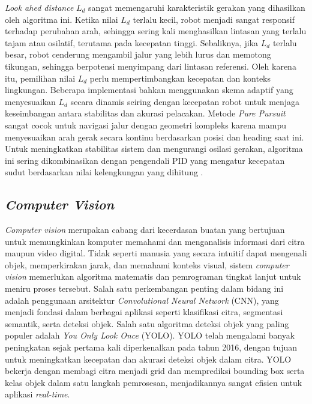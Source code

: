 \emph{Look ahed distance} \(L_d\) sangat memengaruhi karakteristik gerakan yang dihasilkan oleh algoritma ini. Ketika nilai \(L_d\) terlalu kecil, robot menjadi sangat responsif terhadap perubahan arah, sehingga sering kali menghasilkan lintasan yang terlalu tajam atau osilatif, terutama pada kecepatan tinggi. Sebaliknya, jika \(L_d\) terlalu besar, robot cenderung mengambil jalur yang lebih lurus dan memotong tikungan, sehingga berpotensi menyimpang dari lintasan referensi. Oleh karena itu, pemilihan nilai \(L_d\) perlu mempertimbangkan kecepatan dan konteks lingkungan. Beberapa implementasi bahkan menggunakan skema adaptif yang menyesuaikan \(L_d\) secara dinamis seiring dengan kecepatan robot untuk menjaga keseimbangan antara stabilitas dan akurasi pelacakan. Metode \emph{Pure Pursuit} sangat cocok untuk navigasi jalur dengan geometri kompleks karena mampu menyesuaikan arah gerak secara kontinu berdasarkan posisi dan heading saat ini. Untuk meningkatkan stabilitas sistem dan mengurangi osilasi gerakan, algoritma ini sering dikombinasikan dengan pengendali PID yang mengatur kecepatan sudut berdasarkan nilai kelengkungan yang dihitung \cite{coulter1992implementation}.


\subsection{\emph{Computer Vision}}

\emph{Computer vision} merupakan cabang dari kecerdasan buatan yang bertujuan untuk memungkinkan komputer memahami dan menganalisis informasi dari citra maupun video digital. Tidak seperti manusia yang secara intuitif dapat mengenali objek, memperkirakan jarak, dan memahami konteks visual, sistem \emph{computer vision} memerlukan algoritma matematis dan pemrograman tingkat lanjut untuk meniru proses tersebut. Salah satu perkembangan penting dalam bidang ini adalah penggunaan arsitektur \emph{Convolutional Neural Network} (CNN), yang menjadi fondasi dalam berbagai aplikasi seperti klasifikasi citra, segmentasi semantik, serta deteksi objek. Salah satu algoritma deteksi objek yang paling populer adalah \emph{You Only Look Once} (YOLO). YOLO telah mengalami banyak peningkatan sejak pertama kali diperkenalkan pada tahun 2016, dengan tujuan untuk meningkatkan kecepatan dan akurasi deteksi objek dalam citra. YOLO bekerja dengan membagi citra menjadi grid dan memprediksi bounding box serta kelas objek dalam satu langkah pemrosesan, menjadikannya sangat efisien untuk aplikasi \emph{real-time}.


